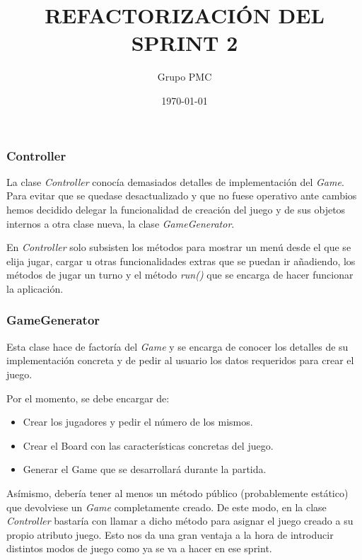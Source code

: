 \documentclass{article}
\title{REFACTORIZACIÓN DEL SPRINT 2}
\date{\today}
\author{Grupo PMC}
\begin{document}
\maketitle

\subsubsection*{Controller}
La clase \textit{Controller} conocía demasiados detalles de implementación del \textit{Game}. Para evitar que se quedase desactualizado y que no fuese operativo ante cambios hemos decidido delegar la funcionalidad de creación del juego y de sus objetos internos a otra clase nueva, la clase \textit{GameGenerator}.

En \textit{Controller} solo subsisten los métodos para mostrar un menú desde el que se elija jugar, cargar u otras funcionalidades extras que se puedan ir añadiendo, los métodos de jugar un turno y el método \textit{run()} que se encarga de hacer funcionar la aplicación.

\subsubsection*{GameGenerator}
Esta clase hace de factoría del \textit{Game} y se encarga de conocer los detalles de su implementación concreta y de pedir al usuario los datos requeridos para crear el juego.

Por el momento, se debe encargar de:
\begin{itemize}
\item Crear los jugadores y pedir el número de los mismos.
\item Crear el Board con las características concretas del juego.
\item Generar el Game que se desarrollará durante la partida.
\end{itemize}

Asímismo, debería tener al menos un método público (probablemente estático) que devolviese un \textit{Game} completamente creado. De este modo, en la clase \textit{Controller} bastaría con llamar a dicho método para asignar el juego creado a su propio atributo juego. Esto nos da una gran ventaja a la hora de introducir distintos modos de juego como ya se va a hacer en ese sprint.
\end{document}
